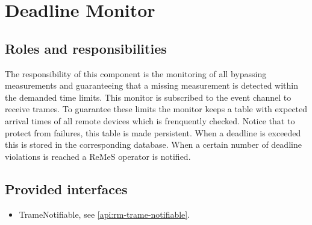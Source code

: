 \section{Deadline Monitor}
\label{element:rm-deadline-monitor}

\subsection{Roles and responsibilities}

\npar The responsibility of this component is the monitoring of all bypassing
measurements and guaranteeing that a missing measurement is detected within the
demanded time limits. This monitor is subscribed to the event channel to receive
trames. To guarantee these limits the monitor keeps a table with expected
arrival times of all remote devices which is frenquently checked. Notice that to
protect from failures, this table is made persistent. When a deadline is
exceeded this is stored in the corresponding database. When a certain number of
deadline violations is reached a ReMeS operator is notified.

\subsection{Provided interfaces}

\begin{itemize}
  \item TrameNotifiable, see \ref{api:rm-trame-notifiable}.
\end{itemize}